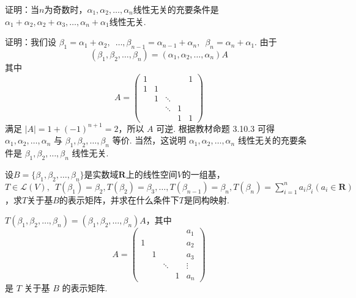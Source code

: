\begin{exercise}
\begin{exgroup}
        \item 证明：当$n$为奇数时，$\alpha_1,\alpha_2,\ldots,\alpha_n$线性无关的充要条件是$\alpha_1+\alpha_2,\alpha_2+\alpha_3,\ldots,\alpha_n+\alpha_1$线性无关.
        \begin{answer}
            证明：我们设 $ \beta_1 = \alpha_1 + \alpha_2,\enspace \ldots, \beta_{n - 1} = \alpha_{n - 1} + \alpha_n,\enspace \beta_n = \alpha_n + \alpha_1 $. 由于
            \[ (\beta_1, \beta_2, \ldots, \beta_n) = (\alpha_1, \alpha_2, \ldots, \alpha_n) A \]
            其中
            \[ A = \begin{pmatrix}
                    1 &   &        &   & 1 \\
                    1 & 1 &        &   &   \\
                        & 1 & \ddots &   &   \\
                        &   & \ddots & 1 &   \\
                        &   &        & 1 & 1
                \end{pmatrix} \]
            满足 $ |A| = 1 + (-1)^{n + 1} = 2 $，所以 $ A $ 可逆. 根据教材命题 3.10.3 可得 $ \alpha_1, \alpha_2, \ldots, \alpha_n $ 与 $ \beta_1, \beta_2, \ldots, \beta_n $ 等价. 当然，这说明 $ \alpha_1, \alpha_2, \ldots, \alpha_n $ 线性无关的充要条件是 $ \beta_1, \beta_2, \ldots, \beta_n $ 线性无关.
        \end{answer}

        \item 设$B=\{\beta_1,\beta_2,\ldots,\beta_n\}$是实数域$\mathbf{R}$上的线性空间$V$的一组基，$T \in \mathcal{L}(V),\enspace T(\beta_1)=\beta_2,T(\beta_2)=\beta_3,\ldots,T(\beta_{n-1}) = \beta_n,T(\beta_n)=\displaystyle\sum_{i=1}^{n}a_i\beta_i(a_i \in \mathbf{R})$，求$T$关于基$B$的表示矩阵，并求在什么条件下$T$是同构映射.
        \begin{answer}
            $ T(\beta_1, \beta_2, \ldots, \beta_n) = (\beta_1, \beta_2, \ldots, \beta_n)A $，其中
            \[ A = \begin{pmatrix}
                      &   &        &   & a_1    \\
                    1 &   &        &   & a_2    \\
                      & 1 &        &   & a_3    \\
                      &   & \ddots &   & \vdots \\
                      &   &        & 1 & a_n
                \end{pmatrix} \]
            是 $ T $ 关于基 $ B $ 的表示矩阵.


\end{answer}
\end{exgroup}
\end{exercise}
